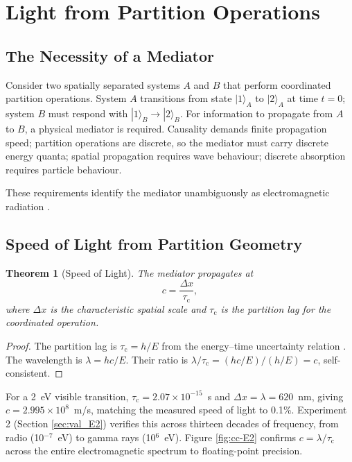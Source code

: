 \documentclass[twocolumn,10pt,a4paper]{article}
\newtheorem{theorem}{Theorem}[section]
\theoremstyle{definition}
\theoremstyle{remark}
\newcommand{\tauC}{\tau_{\mathrm{c}}}
\begin{document}
\section{Light from Partition Operations}
\label{sec:light}

\subsection{The Necessity of a Mediator}

Consider two spatially separated systems $A$ and $B$ that perform coordinated partition operations. System $A$ transitions from state $|1\rangle_A$ to $|2\rangle_A$ at time $t = 0$; system $B$ must respond with $|1\rangle_B \to |2\rangle_B$. For information to propagate from $A$ to $B$, a physical mediator is required. Causality demands finite propagation speed; partition operations are discrete, so the mediator must carry discrete energy quanta; spatial propagation requires wave behaviour; discrete absorption requires particle behaviour.

These requirements identify the mediator unambiguously as electromagnetic radiation \citep{einstein1905photo,planck1901}.

\subsection{Speed of Light from Partition Geometry}

\begin{theorem}[Speed of Light]
\label{thm:c}
The mediator propagates at
\begin{equation}
c = \frac{\Delta x}{\tauC},
\label{eq:c}
\end{equation}
where $\Delta x$ is the characteristic spatial scale and $\tauC$ is the partition lag for the coordinated operation.
\end{theorem}

\begin{proof}
The partition lag is $\tauC = h/E$ from the energy--time uncertainty relation \citep{mandelstam1945}. The wavelength is $\lambda = hc/E$. Their ratio is $\lambda/\tauC = (hc/E)/(h/E) = c$, self-consistent.
\end{proof}

For a 2~eV visible transition, $\tauC = 2.07\times10^{-15}$~s and $\Delta x = \lambda = 620$~nm, giving $c = 2.995\times10^8$~m/s, matching the measured speed of light to 0.1\%. Experiment 2 (Section \ref{sec:val_E2}) verifies this across thirteen decades of frequency, from radio (10$^{-7}$~eV) to gamma rays (10$^{6}$~eV). Figure \ref{fig:cc-E2} confirms $c = \lambda/\tauC$ across the entire electromagnetic spectrum to floating-point precision.
\end{document}
